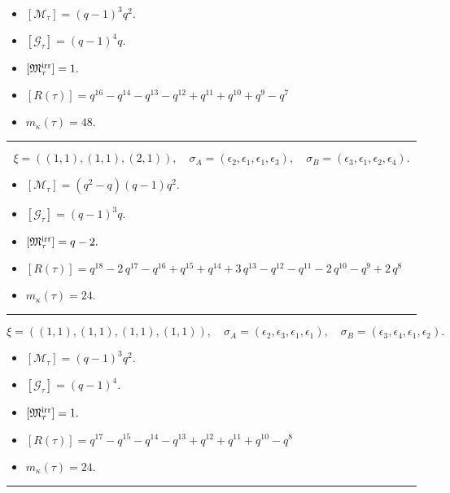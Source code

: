\documentclass[10pt,a4paper]{amsart}
\begin{document}
\begin{itemize}
 \item $[\mathcal{M}_{\tau}] = {\left(q - 1\right)}^{3} q^{2} .$

 \item $[\mathcal{G}_{\tau}] = {\left(q - 1\right)}^{4} q .$

 \item $[{\frak M}_{\tau}^{\textrm{irr}}] = 1 .$

 \item $[R(\tau)] = q^{16} - q^{14} - q^{13} - q^{12} + q^{11} + q^{10} + q^{9} - q^{7} $

 \item $m_{\kappa}(\tau) = 48 .$

 \end{itemize}
\noindent\rule{8cm}{0.4pt}

$$\xi = ({(1, 1)}, {(1, 1)}, {(2, 1)}),\quad \sigma_A = ({{\epsilon_2}}, {{\epsilon_1}}, {{\epsilon_1, \epsilon_3}}),\quad \sigma_B = ({{\epsilon_3}}, {{\epsilon_1}}, {{\epsilon_2, \epsilon_4}}).$$

\begin{itemize}
 \item $[\mathcal{M}_{\tau}] = {\left(q^{2} - q\right)} {\left(q - 1\right)} q^{2} .$

 \item $[\mathcal{G}_{\tau}] = {\left(q - 1\right)}^{3} q .$

 \item $[{\frak M}_{\tau}^{\textrm{irr}}] = q - 2 .$

 \item $[R(\tau)] = q^{18} - 2 \, q^{17} - q^{16} + q^{15} + q^{14} + 3 \, q^{13} - q^{12} - q^{11} - 2 \, q^{10} - q^{9} + 2 \, q^{8} $

 \item $m_{\kappa}(\tau) = 24 .$

 \end{itemize}
\noindent\rule{8cm}{0.4pt}

$$\xi = ({(1, 1)}, {(1, 1)}, {(1, 1), (1, 1)}),\quad \sigma_A = ({{\epsilon_2}}, {{\epsilon_3}}, {{\epsilon_1}, {\epsilon_1}}),\quad \sigma_B = ({{\epsilon_3}}, {{\epsilon_4}}, {{\epsilon_1}, {\epsilon_2}}).$$

\begin{itemize}
 \item $[\mathcal{M}_{\tau}] = {\left(q - 1\right)}^{3} q^{2} .$

 \item $[\mathcal{G}_{\tau}] = {\left(q - 1\right)}^{4} .$

 \item $[{\frak M}_{\tau}^{\textrm{irr}}] = 1 .$

 \item $[R(\tau)] = q^{17} - q^{15} - q^{14} - q^{13} + q^{12} + q^{11} + q^{10} - q^{8} $

 \item $m_{\kappa}(\tau) = 24 .$

 \end{itemize}
\noindent\rule{8cm}{0.4pt}
\end{document}
